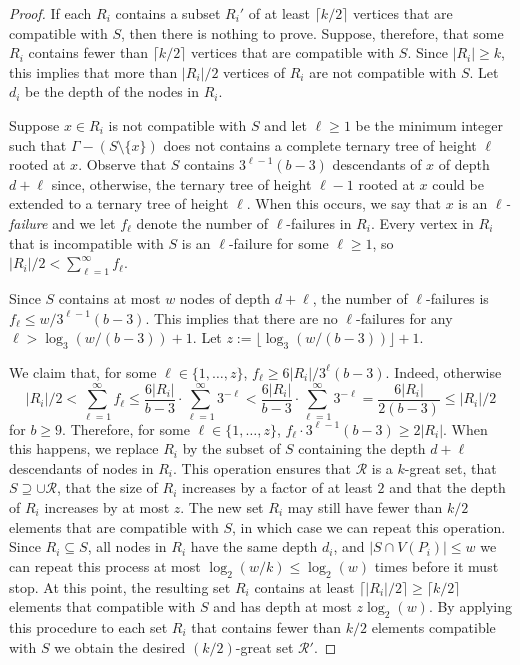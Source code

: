 \documentclass{patmorin}
\newcommand{\defin}[1]{\emph{\color{brightmaroon}#1}}
\begin{document}
\begin{proof}
  If each $R_i$ contains a subset $R_i'$ of at least $\lceil k/2\rceil$ vertices that are compatible with $S$, then there is nothing to prove.  Suppose, therefore, that some $R_i$ contains fewer than $\lceil k/2\rceil$ vertices that are compatible with $S$.  Since $|R_i|\ge k$, this implies that more than $|R_i|/2$ vertices of $R_i$ are not compatible with $S$. Let $d_i$ be the depth of the nodes in $R_i$.  

  Suppose $x\in R_i$ is not compatible with $S$ and let $\ell\ge 1$ be the minimum integer such that $\Gamma-(S\setminus\{x\})$ does not contains a complete ternary tree of height $\ell$ rooted at $x$.  Observe that $S$ contains $3^{\ell-1}(b-3)$ descendants of $x$ of depth $d+\ell$ since, otherwise, the ternary tree of height $\ell-1$ rooted at $x$ could be extended to a ternary tree of height $\ell$.  When this occurs, we say that $x$ is an \defin{$\ell$-failure} and we let $f_\ell$ denote the number of $\ell$-failures in $R_i$.  Every vertex in $R_i$ that is incompatible with $S$ is an $\ell$-failure for some $\ell\ge 1$, so $|R_i|/2 < \sum_{\ell=1}^\infty f_\ell$.

  Since $S$ contains at most $w$ nodes of depth $d+\ell$, the number of $\ell$-failures is $f_\ell \le w/3^{\ell-1}(b-3)$.  This implies that there are no $\ell$-failures for any $\ell > \log_3 (w/(b-3)) + 1$.  
  Let $z:= \lfloor\log_3 (w/(b-3))\rfloor + 1$.

  We claim that, for some $\ell\in\{1,\ldots,z\}$, $f_\ell \ge 6|R_i|/3^{\ell}(b-3)$.  Indeed, otherwise
  \[
    |R_i|/2 < \sum_{\ell=1}^{\infty} f_\ell \le \frac{6|R_i|}{b-3}\cdot \sum_{\ell=1}^\infty 3^{-\ell} < \frac{6|R_i|}{b-3}\cdot \sum_{\ell=1}^\infty 3^{-\ell}
    = \frac{6|R_i|}{2(b-3)}  \le  |R_i|/2
  \]
  for $b\ge 9$. Therefore, for some $\ell\in\{1,\ldots,z\}$, $f_\ell\cdot 3^{\ell-1}(b-3) \ge 2|R_i|$.  When this happens, we replace $R_i$ by the subset of $S$ containing the depth $d+\ell$ descendants of nodes in $R_i$.  This operation ensures that $\mathcal{R}$ is a $k$-great set, that $S\supseteq \cup\mathcal{R}$, that the size of $R_i$ increases by a factor of at least $2$ and that the depth of $R_i$ increases by at most $z$. The new set $R_i$ may still have fewer than $k/2$ elements that are compatible with $S$, in which case we can repeat this operation.  Since $R_i\subseteq S$, all nodes in $R_i$ have the same depth $d_i$, and $|S\cap V(P_i)|\le w$ we can repeat this process at most $\log_2(w/k)\le \log_2(w)$ times before it must stop.  At this point, the resulting set $R_i$ contains at least $\lceil|R_i|/2\rceil\ge \lceil k/2\rceil$ elements that compatible with $S$ and has depth at most $z\log_2(w)$. By applying this procedure to each set $R_i$ that contains fewer than $k/2$ elements compatible with $S$ we obtain the desired $(k/2)$-great set $\mathcal{R}'$.
\end{proof}
\end{document}
